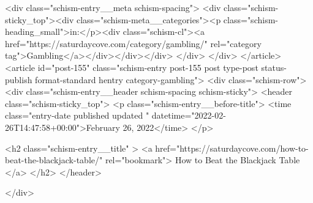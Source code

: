 {		<div class="schism-entry__meta schism-spacing">			<div class="schism-sticky_top"><div class="schism-meta__categories"><p class="schism-heading_small">in:</p><div class="schism-cl"><a href="https://saturdaycove.com/category/gambling/" rel="category tag">Gambling</a></div></div></div>		</div>
	</div>
</article>
<article id="post-155" class="schism-entry post-155 post type-post status-publish format-standard hentry category-gambling">
	<div class="schism-row">		<div class="schism-entry__header schism-spacing schism-sticky">			<header class="schism-sticky_top">				<p class="schism-entry__before-title">
					<time class="entry-date published updated " datetime="2022-02-26T14:47:58+00:00">February 26, 2022</time>				</p>

				<h2 class="schism-entry__title" >
					<a href="https://saturdaycove.com/how-to-beat-the-blackjack-table/" rel="bookmark">
						How to Beat the Blackjack Table					</a>
				</h2>
			</header>

					</div>

}
